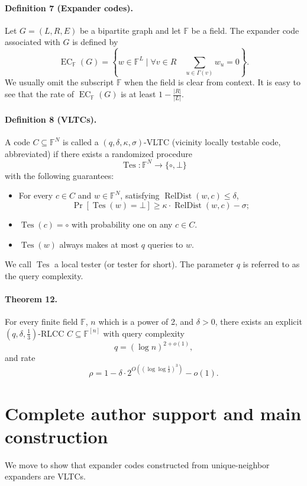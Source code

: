 \paragraph{Definition 7 (Expander codes).} Let $G=(L,R,E)$ be a bipartite graph and let $\mathbb F$ be a field. The expander code associated with $G$ is defined by
\[\operatorname{EC}_{\mathbb F}(G)=\left\{w\in\mathbb F^L\mid\forall v\in R\quad\sum_{u\in\Gamma(v)}w_u=0\right\}.\]
We usually omit the subscript $\mathbb F$ when the field is clear from context.
It is easy to see that the rate of $\operatorname{EC}_{\mathbb F}(G)$ is at least $1-\frac{|R|}{|L|}$.
\paragraph{Definition 8 (VLTCs).} A code $C\subseteq\mathbb F^N$ is called a $(q,\delta,\kappa,\sigma)$-VLTC (vicinity locally testable code, abbreviated) if there exists a randomized procedure
\[\operatorname{Tes}:\mathbb F^N\to\{\circ,\bot\}\]
with the following guarantees:
\begin{itemize}
\item For every $c\in C$ and $w\in\mathbb F^N$, satisfying $\operatorname{RelDist}(w,c)\le\delta$,
\[\Pr[\operatorname{Tes}(w)=\bot]\ge\kappa\cdot\operatorname{RelDist}(w,c)-\sigma;\]
\item $\operatorname{Tes}(c)=\circ$ with probability one on any $c\in C$.
\item $\operatorname{Tes}(w)$ always makes at most $q$ queries to $w$.
\end{itemize}
We call $\operatorname{Tes}$ a local tester (or tester for short). The parameter $q$ is referred to as the query complexity.
\paragraph{Theorem 12.} For every finite field $\mathbb F$, $n$ which is a power of 2, and $\delta>0$, there exists an explicit $(q,\delta,\frac13)$-RLCC $C\subseteq\mathbb F^{[n]}$ with query complexity
\[q=(\log n)^{2+o(1)},\]
and rate
\[\rho=1-\delta\cdot2^{O((\log\log\frac1\delta)^3)}-o(1).\]
\section*{Complete author support and main construction}
We move to show that expander codes constructed from unique-neighbor expanders are VLTCs.
